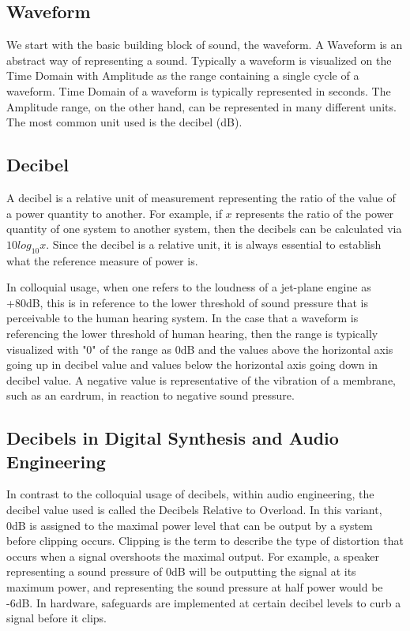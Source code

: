\documentclass[a4paper,12pt]{report}
\begin{document}
\subsection{Waveform}
\label{subsec:waveform}
We start with the basic building block of sound, the waveform. A Waveform is an abstract way of representing a sound. Typically a waveform is visualized on the Time Domain with Amplitude as the range containing a single cycle of a waveform. Time Domain of a waveform is typically represented in seconds. The Amplitude range, on the other hand, can be represented in many different units. The most common unit used is the decibel (dB). 

\subsection{Decibel}
\label{subsec:decibel}
A decibel is a relative unit of measurement representing the ratio of the value of a power quantity to another. For example, if $x$ represents the ratio of the power quantity of one system to another system, then the decibels can be calculated via $10 log_10 x$. Since the decibel is a relative unit, it is always essential to establish what the reference measure of power is. 

In colloquial usage, when one refers to the loudness of a jet-plane engine as +80dB, this is in reference to the lower threshold of sound pressure that is perceivable to the human hearing system. In the case that a waveform is referencing the lower threshold of human hearing, then the range is typically visualized with "0" of the range as 0dB and the values above the horizontal axis going up in decibel value and values below the horizontal axis going down in decibel value. A negative value is representative of the vibration of a membrane, such as an eardrum, in reaction to negative sound pressure. 

\subsection{Decibels in Digital Synthesis and Audio Engineering}
\label{subsec:decibelindigitalsynthesis}
In contrast to the colloquial usage of decibels, within audio engineering, the decibel value used is called the Decibels Relative to Overload.  In this variant, 0dB is assigned to the maximal power level that can be output by a system before clipping occurs. Clipping is the term to describe the type of distortion that occurs when a signal overshoots the maximal output. For example, a speaker representing a sound pressure of 0dB will be outputting the signal at its maximum power, and representing the sound pressure at half power would be -6dB. In hardware, safeguards are implemented at certain decibel levels to curb a signal before it clips.
\end{document}
